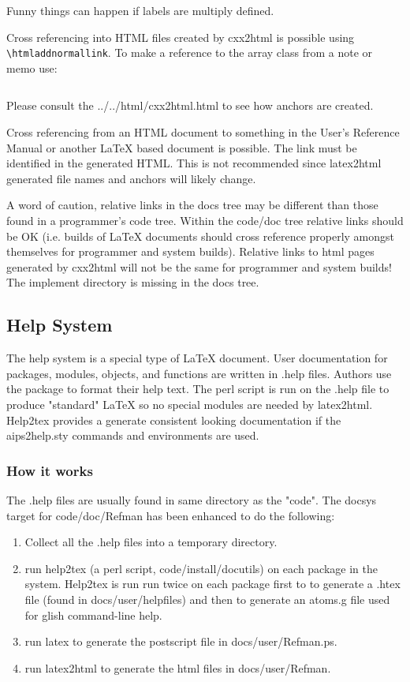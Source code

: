 Funny things can happen if labels are multiply defined.


Cross referencing into HTML files created by cxx2html is possible using
\verb!\htmladdnormallink!.  To make a reference to the array class
from a note or memo use:
\begin{verbatim}
\end{verbatim}

Please consult the 
{../../html/cxx2html.html} to see how anchors are created.

Cross referencing from an HTML document to something in the User's
Reference Manual or another LaTeX based document is possible.
The link must be identified 
in the generated HTML.  This is not recommended since latex2html generated
file names and anchors will likely change.

A word of caution, relative links in the docs tree may be different than those
found in a programmer's code tree.  Within the code/doc tree relative links
should be OK (i.e. builds of LaTeX documents should cross reference properly
amongst themselves for programmer and system builds).  Relative links to html
pages generated by cxx2html will not be the same for programmer and system
builds!  The implement directory is missing in the docs tree.



\subsection{Help System}
The help system is a special type of LaTeX document.  User documentation for
packages, modules, objects, and functions are written in .help files.
Authors use the  package to format their
help text.  The perl script  is run on the
.help file to produce "standard" LaTeX so no special modules are needed by
latex2html.
Help2tex provides a generate consistent looking documentation if the
aips2help.sty commands and environments are used.

\subsubsection{How it works}
The .help files are usually found in same directory as the "code".
The docsys target for code/doc/Refman has been enhanced to do the following:
\begin{enumerate}
\item Collect all the .help files into a temporary directory.
\item run help2tex (a perl script, code/install/docutils) on each package in
the system. Help2tex is run run twice on each package first to to generate
a .htex file (found in docs/user/helpfiles) and then to generate an atoms.g
file used for glish command-line help.
\item run latex to generate the postscript file in docs/user/Refman.ps.
\item run latex2html to generate the html files in docs/user/Refman.
\end{enumerate}

